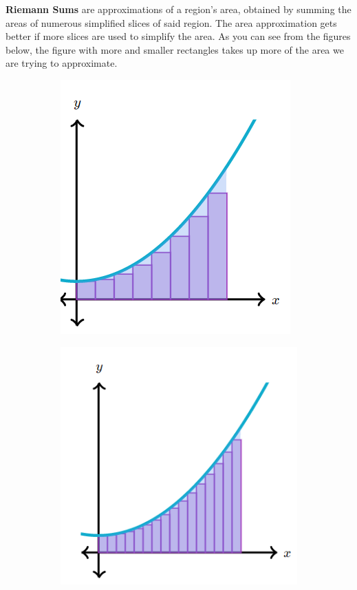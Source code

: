 \documentclass{article}
\begin{document}
            \textbf{Riemann Sums} are approximations of a region's area, obtained by summing the
            areas of numerous simplified slices of said region. The area approximation gets better
            if more slices are used to simplify the area. As you can see from the figures below,
            the figure with more and smaller rectangles takes up more of the area we are trying to
            approximate.

            \begin{figure} [hbt!]
                \centering
                \begin{subfigure}[b]{.45\textwidth}
                    \includegraphics[scale=0.8]{Resources/Unit4Integration/Riemann1}
                \end{subfigure}
                \begin{subfigure}[b]{.45\textwidth}
                    \includegraphics[scale=0.8]{Resources/Unit4Integration/Riemann2}
                \end{subfigure}
            \end{figure}
\end{document}
